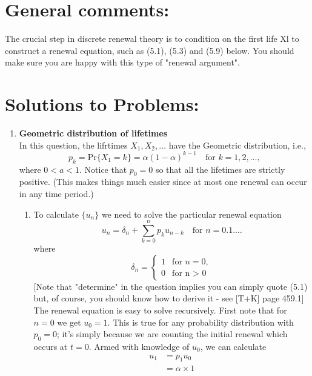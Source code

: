 \documentclass[11pt,a4paper]{article}
\begin{document}
  \section*{General comments:}
  The crucial step in discrete renewal theory is to condition on the first life Xl to construct a renewal equation, such as (5.1), (5.3) and (5.9) below. You should make sure you are happy with this type of "renewal argument".

  \section*{Solutions to Problems:}
  \begin{enumerate}
    \item \textbf{Geometric distribution of lifetimes}\\
    In this question, the lifrtimes $X_1, X_2,\ldots$ have the Geometric distribution, i.e.,
    $$
    p_k = \text{Pr}\{X_1 = k\} = \alpha(1 - \alpha)^{k - 1}\quad \text{for $k = 1, 2, \ldots$},
    $$
    where $0 < a < 1$. Notice that $p_0 = 0$ so that all the lifetimes are strictly positive. (This makes things much easier since at most one renewal can occur in any time period.)
    \begin{enumerate}
      \item To calculate $\{u_n\}$ we need to solve the particular renewal equation
      \begin{equation}\tag{5.1}
        u_n = \delta_n + \sum_{k = 0}^np_ku_{n - k}\quad \text{for $n = 0.1.\ldots$}
      \end{equation}
      where
      $$
      \delta_n =
      \begin{cases}
        1 & \text{for $n = 0$},\\
        0 & \text{for n > 0}
      \end{cases}
      $$
      [Note that "determine" in the question implies you can simply quote (5.1) but, of course, you should know how to derive it - see [T+K] page 459.1]\\
      The renewal equation is easy to solve recursively. First note that for $n = 0$ we get $u_0 = 1$. This is true for any probability distribution with $p_0 = 0$; it's simply because we are counting the initial renewal which occurs at $t = 0$. Armed with knowledge of $u_0$, we can calculate
      \begin{align*}
        u_1
        &= p_1u_0\\
        &= \alpha \times 1\\

\end{align*}
\end{enumerate}
\end{enumerate}
\end{document}
